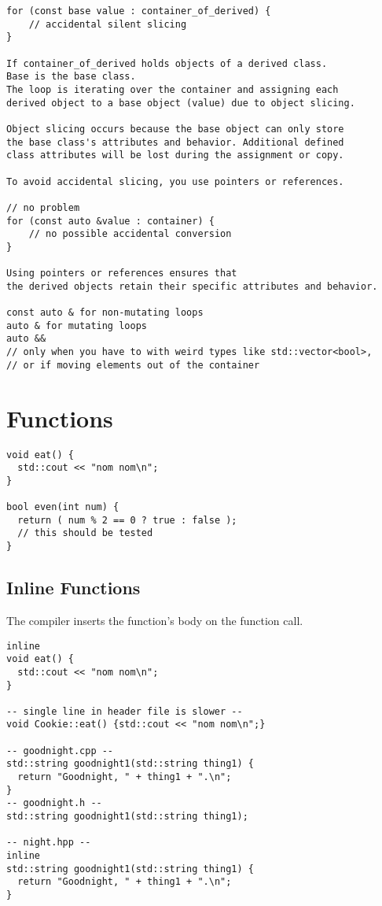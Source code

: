 \documentclass[openany]{report}
\begin{document}
\begin{verbatim}
for (const base value : container_of_derived) {
    // accidental silent slicing
}

If container_of_derived holds objects of a derived class. 
Base is the base class.
The loop is iterating over the container and assigning each
derived object to a base object (value) due to object slicing.

Object slicing occurs because the base object can only store
the base class's attributes and behavior. Additional defined 
class attributes will be lost during the assignment or copy.

To avoid accidental slicing, you use pointers or references.

// no problem
for (const auto &value : container) {
    // no possible accidental conversion
}

Using pointers or references ensures that 
the derived objects retain their specific attributes and behavior.

const auto & for non-mutating loops
auto & for mutating loops
auto && 
// only when you have to with weird types like std::vector<bool>,
// or if moving elements out of the container
\end{verbatim}

\section{Functions}

\begin{verbatim}
void eat() {
  std::cout << "nom nom\n";
}

bool even(int num) {
  return ( num % 2 == 0 ? true : false );
  // this should be tested
}
\end{verbatim}

\subsection{Inline Functions}

The compiler inserts the function’s body on the function call.

\begin{verbatim}
inline 
void eat() {
  std::cout << "nom nom\n";
}

-- single line in header file is slower --
void Cookie::eat() {std::cout << "nom nom\n";}

-- goodnight.cpp --
std::string goodnight1(std::string thing1) {
  return "Goodnight, " + thing1 + ".\n";
}
-- goodnight.h --
std::string goodnight1(std::string thing1);

-- night.hpp -- 
inline
std::string goodnight1(std::string thing1) {
  return "Goodnight, " + thing1 + ".\n";
}
\end{verbatim}
\end{document}

